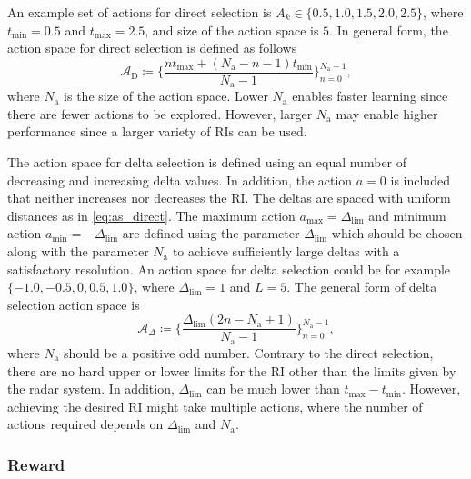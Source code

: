 \documentclass[english, 12pt, a4paper, elec, utf8, a-1b, online]{aaltothesis}
\newcommand{\amax}{a_\text{max}}
\newcommand{\amin}{a_\text{min}}
\newcommand{\As}{\mathcal{A}}
\newcommand{\tmax}{t_\text{max}}
\newcommand{\tmin}{t_\text{min}}
\newcommand{\deltalim}{\Delta_\text{lim}}
\newcommand{\Asdir}{\As_\text{D}}
\newcommand{\Asdelta}{\As_\Delta}
\newcommand{\nacts}{{N_\text{a}}}
\begin{document}
An example set of actions for direct selection is $A_k \in \{0.5, 1.0, 1.5, 2.0, 2.5\}$, where $\tmin=0.5$ and $\tmax=2.5$, and size of the action space is $5$.
In general form, the action space for direct selection is defined as follows
\begin{equation}\label{eq:as_direct}
    \Asdir \coloneqq \{ \frac{n \tmax + (\nacts-n-1) \tmin}{\nacts-1} \}_{n=0}^{\nacts-1},    
\end{equation}
where $\nacts$ is the size of the action space.
Lower $\nacts$ enables faster learning since there are fewer actions to be explored.
However, larger $\nacts$ may enable higher performance since a larger variety of RIs can be used.

The action space for delta selection is defined using an equal number of decreasing and increasing delta values. 
In addition, the action $a=0$ is included that neither increases nor decreases the RI.
The deltas are spaced with uniform distances as in \eqref{eq:as_direct}.
The maximum action $\amax=\deltalim$ and minimum action $\amin=-\deltalim$ are defined using the parameter $\deltalim$ which should be chosen along with the parameter $\nacts$ to achieve sufficiently large deltas with a satisfactory resolution.
An action space for delta selection could be for example $\{ -1.0, -0.5, 0, 0.5, 1.0 \}$, where $\deltalim=1$ and $L=5$.
The general form of delta selection action space is
\begin{equation}\label{eq:as_delta}
    \Asdelta \coloneqq \{ \frac{\deltalim \left( 2 n - \nacts + 1 \right)}{\nacts-1} \}_{n=0}^{\nacts-1},
\end{equation}
where $\nacts$ should be a positive odd number.
Contrary to the direct selection, there are no hard upper or lower limits for the RI other than the limits given by the radar system.
In addition, $\deltalim$ can be much lower than $\tmax - \tmin$.
However, achieving the desired RI might take multiple actions, where the number of actions required depends on $\deltalim$ and $\nacts$.

\subsubsection{Reward} \label{sec:rewards}
\end{document}
